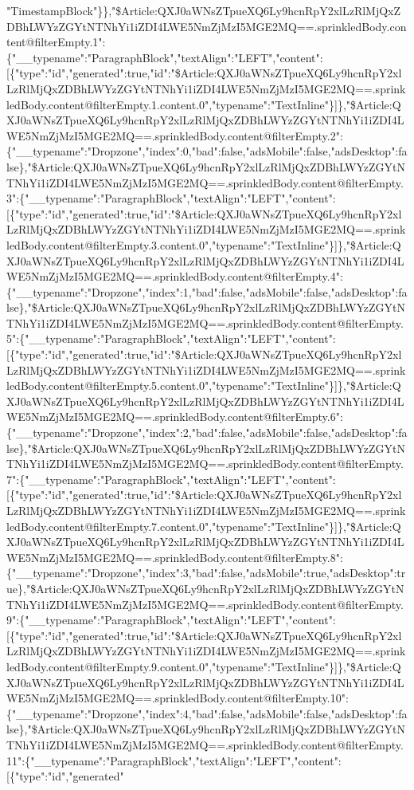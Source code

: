 "TimestampBlock"\}\},"\$Article:QXJ0aWNsZTpueXQ6Ly9hcnRpY2xlLzRlMjQxZDBhLWYzZGYtNTNhYi1iZDI4LWE5NmZjMzI5MGE2MQ==.sprinkledBody.content@filterEmpty.1":\{"\_\_typename":"ParagraphBlock","textAlign":"LEFT","content":{[}\{"type":"id","generated":true,"id":"\$Article:QXJ0aWNsZTpueXQ6Ly9hcnRpY2xlLzRlMjQxZDBhLWYzZGYtNTNhYi1iZDI4LWE5NmZjMzI5MGE2MQ==.sprinkledBody.content@filterEmpty.1.content.0","typename":"TextInline"\}{]}\},"\$Article:QXJ0aWNsZTpueXQ6Ly9hcnRpY2xlLzRlMjQxZDBhLWYzZGYtNTNhYi1iZDI4LWE5NmZjMzI5MGE2MQ==.sprinkledBody.content@filterEmpty.2":\{"\_\_typename":"Dropzone","index":0,"bad":false,"adsMobile":false,"adsDesktop":false\},"\$Article:QXJ0aWNsZTpueXQ6Ly9hcnRpY2xlLzRlMjQxZDBhLWYzZGYtNTNhYi1iZDI4LWE5NmZjMzI5MGE2MQ==.sprinkledBody.content@filterEmpty.3":\{"\_\_typename":"ParagraphBlock","textAlign":"LEFT","content":{[}\{"type":"id","generated":true,"id":"\$Article:QXJ0aWNsZTpueXQ6Ly9hcnRpY2xlLzRlMjQxZDBhLWYzZGYtNTNhYi1iZDI4LWE5NmZjMzI5MGE2MQ==.sprinkledBody.content@filterEmpty.3.content.0","typename":"TextInline"\}{]}\},"\$Article:QXJ0aWNsZTpueXQ6Ly9hcnRpY2xlLzRlMjQxZDBhLWYzZGYtNTNhYi1iZDI4LWE5NmZjMzI5MGE2MQ==.sprinkledBody.content@filterEmpty.4":\{"\_\_typename":"Dropzone","index":1,"bad":false,"adsMobile":false,"adsDesktop":false\},"\$Article:QXJ0aWNsZTpueXQ6Ly9hcnRpY2xlLzRlMjQxZDBhLWYzZGYtNTNhYi1iZDI4LWE5NmZjMzI5MGE2MQ==.sprinkledBody.content@filterEmpty.5":\{"\_\_typename":"ParagraphBlock","textAlign":"LEFT","content":{[}\{"type":"id","generated":true,"id":"\$Article:QXJ0aWNsZTpueXQ6Ly9hcnRpY2xlLzRlMjQxZDBhLWYzZGYtNTNhYi1iZDI4LWE5NmZjMzI5MGE2MQ==.sprinkledBody.content@filterEmpty.5.content.0","typename":"TextInline"\}{]}\},"\$Article:QXJ0aWNsZTpueXQ6Ly9hcnRpY2xlLzRlMjQxZDBhLWYzZGYtNTNhYi1iZDI4LWE5NmZjMzI5MGE2MQ==.sprinkledBody.content@filterEmpty.6":\{"\_\_typename":"Dropzone","index":2,"bad":false,"adsMobile":false,"adsDesktop":false\},"\$Article:QXJ0aWNsZTpueXQ6Ly9hcnRpY2xlLzRlMjQxZDBhLWYzZGYtNTNhYi1iZDI4LWE5NmZjMzI5MGE2MQ==.sprinkledBody.content@filterEmpty.7":\{"\_\_typename":"ParagraphBlock","textAlign":"LEFT","content":{[}\{"type":"id","generated":true,"id":"\$Article:QXJ0aWNsZTpueXQ6Ly9hcnRpY2xlLzRlMjQxZDBhLWYzZGYtNTNhYi1iZDI4LWE5NmZjMzI5MGE2MQ==.sprinkledBody.content@filterEmpty.7.content.0","typename":"TextInline"\}{]}\},"\$Article:QXJ0aWNsZTpueXQ6Ly9hcnRpY2xlLzRlMjQxZDBhLWYzZGYtNTNhYi1iZDI4LWE5NmZjMzI5MGE2MQ==.sprinkledBody.content@filterEmpty.8":\{"\_\_typename":"Dropzone","index":3,"bad":false,"adsMobile":true,"adsDesktop":true\},"\$Article:QXJ0aWNsZTpueXQ6Ly9hcnRpY2xlLzRlMjQxZDBhLWYzZGYtNTNhYi1iZDI4LWE5NmZjMzI5MGE2MQ==.sprinkledBody.content@filterEmpty.9":\{"\_\_typename":"ParagraphBlock","textAlign":"LEFT","content":{[}\{"type":"id","generated":true,"id":"\$Article:QXJ0aWNsZTpueXQ6Ly9hcnRpY2xlLzRlMjQxZDBhLWYzZGYtNTNhYi1iZDI4LWE5NmZjMzI5MGE2MQ==.sprinkledBody.content@filterEmpty.9.content.0","typename":"TextInline"\}{]}\},"\$Article:QXJ0aWNsZTpueXQ6Ly9hcnRpY2xlLzRlMjQxZDBhLWYzZGYtNTNhYi1iZDI4LWE5NmZjMzI5MGE2MQ==.sprinkledBody.content@filterEmpty.10":\{"\_\_typename":"Dropzone","index":4,"bad":false,"adsMobile":false,"adsDesktop":false\},"\$Article:QXJ0aWNsZTpueXQ6Ly9hcnRpY2xlLzRlMjQxZDBhLWYzZGYtNTNhYi1iZDI4LWE5NmZjMzI5MGE2MQ==.sprinkledBody.content@filterEmpty.11":\{"\_\_typename":"ParagraphBlock","textAlign":"LEFT","content":{[}\{"type":"id","generated"